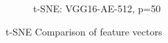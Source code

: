 \begin{figure}[H]
\begin{subfigure}[b]{0.47\textwidth}
      \caption{t-SNE: VGG16-AE-512,  p=50}
      \label{fig:tsne2}
    \end{subfigure}
    \caption{t-SNE Comparison of feature vectors}
    \label{teesnee}
\end{figure}
